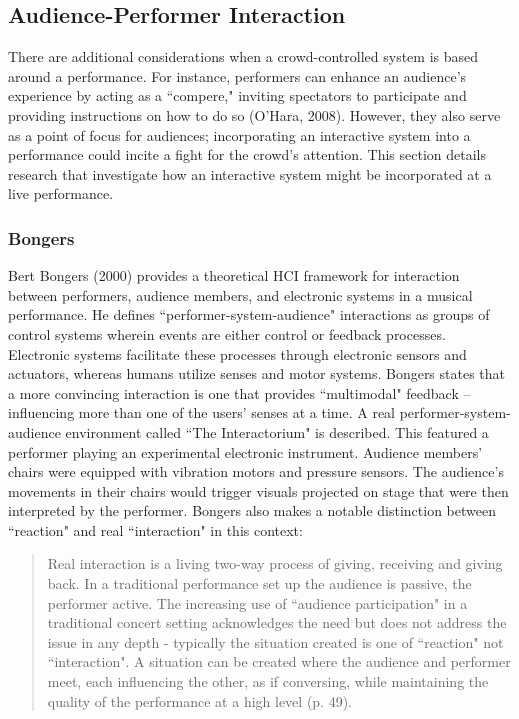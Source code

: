 \subsection{Audience-Performer Interaction}

There are additional considerations when a crowd-controlled system is based around a performance. For instance, performers can enhance an audience's experience by acting as a ``compere," inviting spectators to participate and providing instructions on how to do so (O'Hara, 2008). However, they also serve as a point of focus for audiences; incorporating an interactive system into a performance could incite a fight for the crowd's attention. This section details research that investigate how an interactive system might be incorporated at a live performance.

\subsubsection{Bongers}

Bert Bongers (2000) provides a theoretical HCI framework for interaction between performers, audience members, and electronic systems in a musical performance. He defines ``performer-system-audience" interactions as groups of control systems wherein events are either control or feedback processes. Electronic systems facilitate these processes through electronic sensors and actuators, whereas humans utilize senses and motor systems. Bongers states that a more convincing interaction is one that provides ``multimodal" feedback -- influencing more than one of the users' senses at a time. A real performer-system-audience environment called ``The Interactorium" is described. This featured a performer playing an experimental electronic instrument. Audience members' chairs were equipped with vibration motors and pressure sensors. The audience's movements in their chairs would trigger visuals projected on stage that were then interpreted by the performer. Bongers also makes a notable distinction between ``reaction" and real ``interaction" in this context:

\begin{quotation}
\onehalfspacing	
Real interaction is a living two-way process of giving, receiving and giving back. In a traditional performance set up the audience is passive, the performer active. The increasing use of ``audience participation" in a traditional concert setting acknowledges the need but does not address the issue in any depth - typically the situation created is one of ``reaction" not ``interaction". A situation can be created where the audience and performer meet, each influencing the other, as if conversing, while maintaining the quality of the performance at a high level (p. 49).
\end{quotation}

